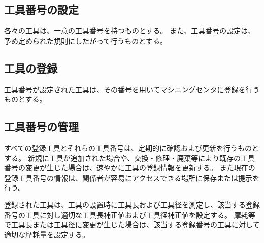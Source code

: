 



\subsection{工具番号の設定}
各々の工具は、一意の工具番号を持つものとする。
また、工具番号の設定は、予め定められた規則にしたがって行うものとする。

\subsection{工具の登録}
工具番号が設定された工具は、その番号を用いてマシニングセンタに登録を行うものとする。

\subsection{工具番号の管理}
すべての登録工具とそれらの工具番号は、定期的に確認および更新を行うものとする。
新規に工具が追加された場合や、交換・修理・廃棄等により既存の工具番号の変更が生じた場合は、速やかに工具の登録情報を更新する。
また現在の登録工具番号の情報は、関係者が容易にアクセスできる場所に保存または提示を行う。


登録された工具は、工具の設置時に工具長および工具径を測定し、該当する登録番号の工具に対し適切な工具長補正値および工具径補正値を設定する。
摩耗等で工具長または工具径に変更が生じた場合は、該当する登録番号の工具に対して適切な摩耗量を設定する。

